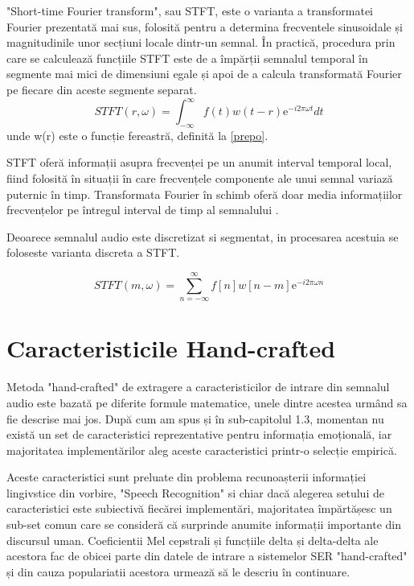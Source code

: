 \documentclass[a4paper,12pt]{book}
\begin{document}
			"Short-time Fourier transform", sau STFT, este o varianta a transformatei Fourier prezentată mai sus, folosită pentru a determina frecventele sinusoidale și magnitudinile unor secțiuni locale dintr-un semnal. În practică, procedura prin care se calculează funcțiile STFT este de a împărții semnalul temporal în segmente mai mici de dimensiuni egale și apoi de a calcula transformată Fourier pe fiecare din aceste segmente separat. 
			\begin{equation*}
			STFT(r , \omega) = \int_{-\infty}^{\infty}  f(t) w(t-r)\mathrm{e}^{- i 2\pi \omega t}  dt
			\end{equation*}
			unde w(r) este o funcție fereastră, definită la \ref{prepo}. \par
			STFT oferă informații asupra frecvenței pe un anumit interval temporal local, fiind folosită în situații în care frecvențele componente ale unui semnal variază puternic în timp. Transformata Fourier în schimb oferă doar media informațiilor frecvențelor pe întregul interval de timp al semnalului \cite{stft2}.
			
			Deoarece semnalul audio este discretizat si segmentat, in procesarea acestuia se foloseste varianta discreta a STFT.
			
			\begin{equation}
			STFT(m ,\omega) = \sum_{n=-\infty}^{\infty}  f[n] w[n-m]\mathrm{e}^{- i 2\pi \omega n}  \label{stft}
			\end{equation}
			\section{Caracteristicile Hand-crafted} \label{hand-crafted}
			
			Metoda "hand-crafted" de extragere a caracteristicilor de intrare din semnalul audio este bazată pe diferite formule matematice, unele dintre acestea urmând sa fie descrise mai jos. După cum am spus și în sub-capitolul 1.3, momentan nu există un set de caracteristici reprezentative pentru informația emoțională, iar majoritatea implementărilor aleg aceste caracteristici printr-o selecție empirică. \par  
			Aceste caracteristici sunt preluate din problema recunoașterii informației lingivstice din vorbire, "Speech Recognition" si chiar dacă alegerea setului de caracteristici este subiectivă fiecărei implementări, majoritatea împărtășesc un sub-set comun care se consideră că surprinde anumite informații importante din discursul uman. Coeficientii Mel cepstrali și funcțiile delta și delta-delta ale acestora fac de obicei parte din datele de intrare a sistemelor SER "hand-crafted" și din cauza populariatii acestora urmează să le descriu în continuare. \par
			
\end{document}
